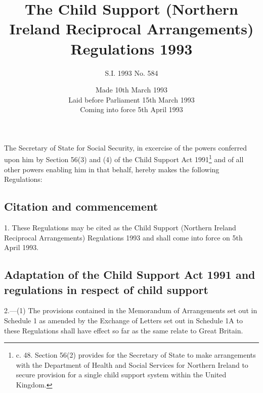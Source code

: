 \documentclass[a4paper]{article}
\title{The Child Support (Northern Ireland Reciprocal Arrangements) Regulations 1993}
\author{S.I. 1993 No. 584}
\date{Made 10th March 1993\\Laid before Parliament 15th March 1993\\Coming into force 5th April 1993}
\begin{document}
\maketitle

\noindent
The Secretary of State for Social Security, in excercise of the powers conferred upon him by Section 56(3) and (4) of the Child Support Act 1991\footnote{ c. 48. Section 56(2) provides for the Secretary of State to make arrangements with the Department of Health and Social Services for Northern Ireland to secure provision for a single child support system within the United Kingdom.} and of all other powers enabling him in that behalf, hereby makes the following Regulations:

{\sloppy

\tableofcontents

}

\setcounter{secnumdepth}{-2}

\subsection[1. Citation and commencement]{Citation and commencement}

1.  These Regulations may be cited as the Child Support (Northern Ireland Reciprocal Arrangements) Regulations 1993 and shall come into force on 5th April 1993.

\subsection[2. Adaptation of the Child Support Act 1991 and regulations in respect of child support]{Adaptation of the Child Support Act 1991 and regulations in respect of child support}

2.—(1) The provisions contained in the Memorandum of Arrangements set out in Schedule 1 
as amended by the Exchange of Letters set out in Schedule 1A  %
to these Regulations shall have effect so far as the same relate to Great Britain.
\end{document}
